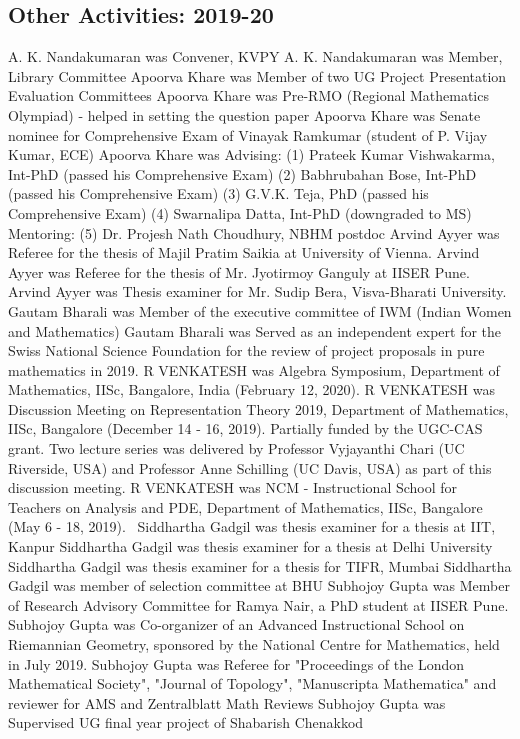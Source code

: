 \subsection{Other Activities: 2019-20}
\begin{enumerate}
A. K. Nandakumaran was Convener, KVPY
A. K. Nandakumaran was Member, Library Committee
Apoorva Khare was Member of two UG Project Presentation Evaluation Committees
Apoorva Khare was Pre-RMO (Regional Mathematics Olympiad) - helped in setting the question paper
Apoorva Khare was Senate nominee for Comprehensive Exam of Vinayak Ramkumar (student of P. Vijay Kumar, ECE)
Apoorva Khare was Advising: (1) Prateek Kumar Vishwakarma, Int-PhD (passed his Comprehensive Exam) (2) Babhrubahan Bose, Int-PhD (passed his Comprehensive Exam) (3) G.V.K. Teja, PhD (passed his Comprehensive Exam) (4) Swarnalipa Datta, Int-PhD (downgraded to MS) Mentoring: (5) Dr. Projesh Nath Choudhury, NBHM postdoc
Arvind Ayyer was Referee for the thesis of Majil Pratim Saikia at University of Vienna.
Arvind Ayyer was Referee for the thesis of Mr. Jyotirmoy Ganguly at IISER Pune.
Arvind Ayyer was Thesis examiner for Mr. Sudip Bera, Visva-Bharati University.
Gautam Bharali was Member of the executive committee of IWM (Indian Women and Mathematics)
Gautam Bharali was Served as an independent expert for the Swiss National Science Foundation for the review of project proposals in pure mathematics in 2019.
R VENKATESH was Algebra Symposium, Department of Mathematics, IISc, Bangalore, India (February 12, 2020).
R VENKATESH was Discussion Meeting on Representation Theory 2019, Department of Mathematics, IISc, Bangalore (December 14 - 16, 2019). Partially funded by the UGC-CAS grant.  Two lecture series was delivered by Professor Vyjayanthi Chari (UC Riverside, USA) and Professor Anne Schilling (UC Davis, USA) as part of this discussion meeting. 
R VENKATESH was NCM - Instructional School for Teachers on Analysis and PDE, Department of Mathematics, IISc, Bangalore (May 6 - 18, 2019). 
Siddhartha Gadgil was thesis examiner for a thesis at IIT, Kanpur
Siddhartha Gadgil was thesis examiner for a thesis at Delhi University
Siddhartha Gadgil was thesis examiner for a thesis for TIFR, Mumbai
Siddhartha Gadgil was member of selection committee at BHU
Subhojoy Gupta was Member of Research Advisory Committee for Ramya Nair, a PhD student at IISER Pune. 
Subhojoy Gupta was Co-organizer of an Advanced Instructional School on Riemannian Geometry, sponsored by the National Centre for Mathematics, held in July 2019.
Subhojoy Gupta was Referee for "Proceedings of the London Mathematical Society", "Journal of Topology", "Manuscripta Mathematica" and reviewer for AMS and Zentralblatt Math Reviews
Subhojoy Gupta was Supervised UG final year project of Shabarish Chenakkod
\end{enumerate}
